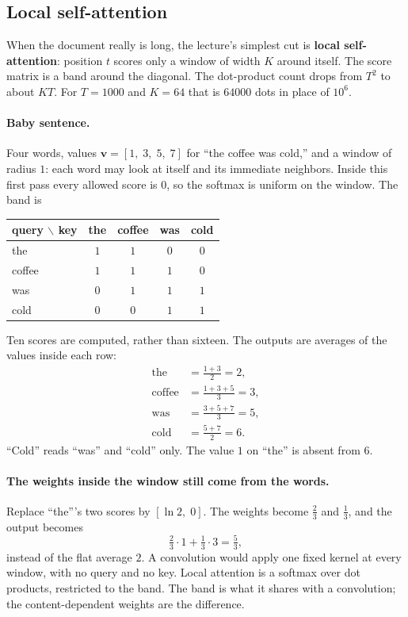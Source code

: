 \documentclass[11pt]{article}
\begin{document}
\subsection{Local self-attention}
\label{sec:local}

When the document really is long, the lecture's simplest cut is
\textbf{local self-attention}: position \(t\) scores only a window of width
\(K\) around itself. The score matrix is a band around the diagonal. The
dot-product count drops from \(T^2\) to about \(K T\). For
\(T=1000\) and \(K=64\) that is \(64000\) dots in place of \(10^6\).

\paragraph{Baby sentence.}
Four words, values \(\mathbf{v}=[1,\;3,\;5,\;7]\) for ``the coffee was
cold,'' and a window of radius \(1\): each word may look at itself and its
immediate neighbors. Inside this first pass every allowed score is \(0\),
so the softmax is uniform on the window. The band is
\begin{center}
\begin{tabular}{@{}lcccc@{}}
\toprule
query \(\backslash\) key & the & coffee & was & cold \\
\midrule
the    & \(1\) & \(1\) & \(0\) & \(0\) \\
coffee & \(1\) & \(1\) & \(1\) & \(0\) \\
was    & \(0\) & \(1\) & \(1\) & \(1\) \\
cold   & \(0\) & \(0\) & \(1\) & \(1\) \\
\bottomrule
\end{tabular}
\end{center}
Ten scores are computed, rather than sixteen. The outputs are averages of
the values inside each row:
\begin{align*}
  \text{the}    &= \tfrac{1+3}{2} = 2,\\
  \text{coffee} &= \tfrac{1+3+5}{3} = 3,\\
  \text{was}    &= \tfrac{3+5+7}{3} = 5,\\
  \text{cold}   &= \tfrac{5+7}{2} = 6.
\end{align*}
``Cold'' reads ``was'' and ``cold'' only. The value \(1\) on ``the'' is
absent from \(6\).

\paragraph{The weights inside the window still come from the words.}
Replace ``the'''s two scores by \([\ln 2,\;0]\). The weights become
\(\tfrac{2}{3}\) and \(\tfrac{1}{3}\), and the output becomes
\[
  \tfrac{2}{3}\cdot 1 + \tfrac{1}{3}\cdot 3 = \tfrac{5}{3},
\]
instead of the flat average \(2\). A convolution would apply one fixed
kernel at every window, with no query and no key. Local attention is a
softmax over dot products, restricted to the band. The band is what it
shares with a convolution; the content-dependent weights are the
difference.
\end{document}
